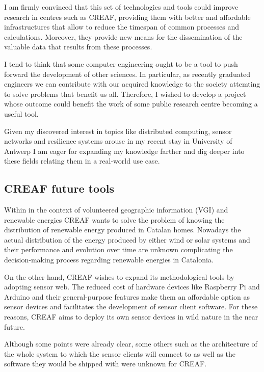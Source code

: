 I am firmly convinced that this set of technologies and tools could improve research in centres such as CREAF, providing them with better and affordable infrastructures that allow to reduce the timespan of common processes and calculations. Moreover, they provide new means for the dissemination of the valuable data that results from these processes.

I tend to think that some computer engineering ought to be a tool to push forward the development of other sciences. In particular, as recently graduated engineers we can contribute with our acquired knowledge to the society attemting to solve problems that benefit us all. Therefore, I wished to develop a project whose outcome could benefit the work of some public research centre becoming a useful tool.

Given my discovered interest in topics like distributed computing, sensor networks and resilience systems arouse in my recent stay in University of Antwerp I am eager for expanding my knowledge farther and dig deeper into these fields relating them in a real-world use case.

\subsection{CREAF future tools}

Within in the context of volunteered geographic information (VGI) and renewable energies CREAF wants to solve the problem of knowing the distribution of renewable energy produced in Catalan homes. Nowadays the actual distribution of the energy produced by either wind or solar systems and their performance and evolution over time are unknown complicating the decision-making process regarding renewable energies in Catalonia.

On the other hand, CREAF wishes to expand its methodological tools by adopting sensor web. The reduced cost of hardware devices like Raspberry Pi and Arduino  and their general-purpose features make them an affordable option as sensor devices and facilitates the development of sensor client software. For these reasons, CREAF aims to deploy its own sensor devices in wild nature in the near future. 

Although some points were already clear, some others such as the architecture of the whole system to which the sensor clients will connect to as well as the software they would be shipped with were unknown for CREAF.


